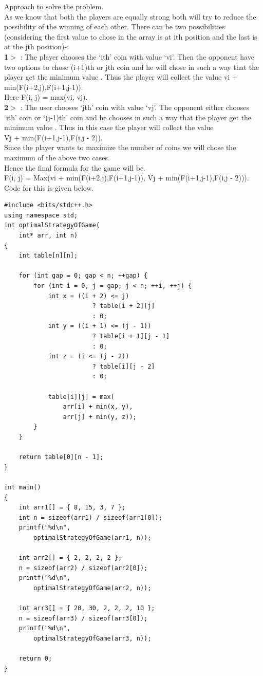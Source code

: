 \documentclass[12pt]{book}
\begin{document}
\newline
Approach to solve the problem.\\
As we know that both the players are equally strong both will try to reduce the possibility of the winning of each other. There can be two possibilities (considering the first value to chose in the array is at ith position and the last is at the jth position)-:\\
\textbf{1$>$} : The player chooses the ‘ith’ coin with value ‘vi’. Then the opponent have two options to chose (i+1)th or jth coin and he will chose in such a way that the player get the minimum value . Thus the player will collect the value vi + min(F(i+2,j),F(i+1,j-1)).\\
Here F(i, j) = max(vi, vj). \\
\textbf{2$>$} :  The user chooses ‘jth’ coin with value ‘vj’. The opponent either chooses ‘ith’ coin or ‘(j-1)th’ coin and he chooses in such a way that the player get the minimum value . Thus in this case the player will collect the value\\
Vj + min(F(i+1,j-1),F(i,j - 2)).\\
Since the player wants to maximize the number of coins we will chose the maximum of the above two cases. \\
\newline
Hence the final formula for the game will be.\\
\newline
F(i, j) = Max(vi + min(F(i+2,j),F(i+1,j-1)), Vj + min(F(i+1,j-1),F(i,j - 2))).\\
\newline
Code for this is given below.\\
\begin{lstlisting}
#include <bits/stdc++.h> 
using namespace std; 
int optimalStrategyOfGame( 
    int* arr, int n) 
{ 
    int table[n][n]; 

    for (int gap = 0; gap < n; ++gap) { 
        for (int i = 0, j = gap; j < n; ++i, ++j) { 
            int x = ((i + 2) <= j) 
                        ? table[i + 2][j] 
                        : 0; 
            int y = ((i + 1) <= (j - 1)) 
                        ? table[i + 1][j - 1] 
                        : 0; 
            int z = (i <= (j - 2)) 
                        ? table[i][j - 2] 
                        : 0; 

            table[i][j] = max( 
                arr[i] + min(x, y), 
                arr[j] + min(y, z)); 
        } 
    } 

    return table[0][n - 1]; 
} 

int main() 
{ 
    int arr1[] = { 8, 15, 3, 7 }; 
    int n = sizeof(arr1) / sizeof(arr1[0]); 
    printf("%d\n", 
        optimalStrategyOfGame(arr1, n)); 

    int arr2[] = { 2, 2, 2, 2 }; 
    n = sizeof(arr2) / sizeof(arr2[0]); 
    printf("%d\n", 
        optimalStrategyOfGame(arr2, n)); 

    int arr3[] = { 20, 30, 2, 2, 2, 10 }; 
    n = sizeof(arr3) / sizeof(arr3[0]); 
    printf("%d\n", 
        optimalStrategyOfGame(arr3, n)); 

    return 0; 
}

\end{lstlisting}
\end{document}
